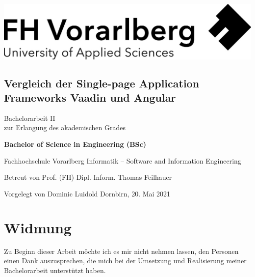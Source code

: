 \documentclass[a4paper,12pt,twoside]{scrreprt}
\begin{document}
\onehalfspacing %

{}
\cleardoublepage %
\thispagestyle{empty}
\begin{titlepage}
    \begin{flushright}
    \includegraphics[width=0.4\linewidth]{images/FHV_FHV-Logo.jpg}
    \end{flushright}
    \begin{flushleft}
    \vspace{0.5cm}
    \section*{Vergleich der Single-page Application Frameworks Vaadin und Angular}
    \vspace{1cm}

    Bachelorarbeit II\\
    zur Erlangung des akademischen Grades
    \vspace{0.5cm}

    \textbf{Bachelor of Science in Engineering (BSc)}

    \vspace{1cm}
    Fachhochschule Vorarlberg\newline
    Informatik – Software and Information Engineering

    \vspace{0.5cm}

    Betreut von\newline
    Prof. (FH) Dipl. Inform. Thomas Feilhauer

    \vspace{0.5cm}

    Vorgelegt von\newline
    Dominic Luidold\newline
    Dornbirn, 20. Mai 2021
    \end{flushleft}
\end{titlepage}

\newpage
\section*{Widmung}
\label{sec:widmung}
Zu Beginn dieser Arbeit möchte ich es mir nicht nehmen lassen, den Personen einen Dank auszusprechen, die mich bei der Umsetzung und Realisierung meiner Bachelorarbeit unterstützt haben.
\end{document}
